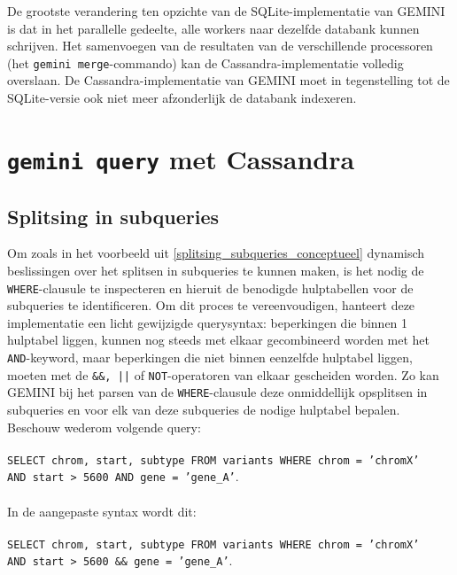 De grootste verandering ten opzichte van de SQLite-implementatie van GEMINI is dat in het parallelle gedeelte, alle workers naar dezelfde databank kunnen schrijven. Het samenvoegen van de resultaten van de verschillende processoren (het \texttt{gemini merge}-commando) kan de Cassandra-implementatie volledig overslaan. De Cassandra-implementatie van GEMINI moet in tegenstelling tot de SQLite-versie ook niet meer afzonderlijk de databank indexeren.

\section{\texttt{gemini query} met Cassandra}
\label{gemini_query_impl}

\subsection{Splitsing in subqueries}

Om zoals in het voorbeeld uit \ref{splitsing_subqueries_conceptueel} dynamisch beslissingen over het splitsen in subqueries te kunnen maken, is het nodig de \texttt{WHERE}-clausule te inspecteren en hieruit de benodigde hulptabellen voor de subqueries te identificeren. Om dit proces te vereenvoudigen, hanteert deze implementatie een licht gewijzigde querysyntax: beperkingen die binnen 1 hulptabel liggen, kunnen nog steeds met elkaar gecombineerd worden met het \texttt{AND}-keyword, maar beperkingen die niet binnen eenzelfde hulptabel liggen, moeten met de \texttt{\&\&, ||} of \texttt{NOT}-operatoren van elkaar gescheiden worden. Zo kan GEMINI bij het parsen van de \texttt{WHERE}-clausule deze onmiddellijk opsplitsen in subqueries en voor elk van deze subqueries de nodige hulptabel bepalen. Beschouw wederom volgende query:\\\\
\texttt{SELECT chrom, start, subtype FROM variants WHERE chrom = 'chromX' \\AND start > 5600 AND gene = 'gene\_A'}.\\\\
In de aangepaste syntax wordt dit:\\\\
\texttt{SELECT chrom, start, subtype FROM variants WHERE chrom = 'chromX' \\AND start > 5600 \&\& gene = 'gene\_A'}.\\

